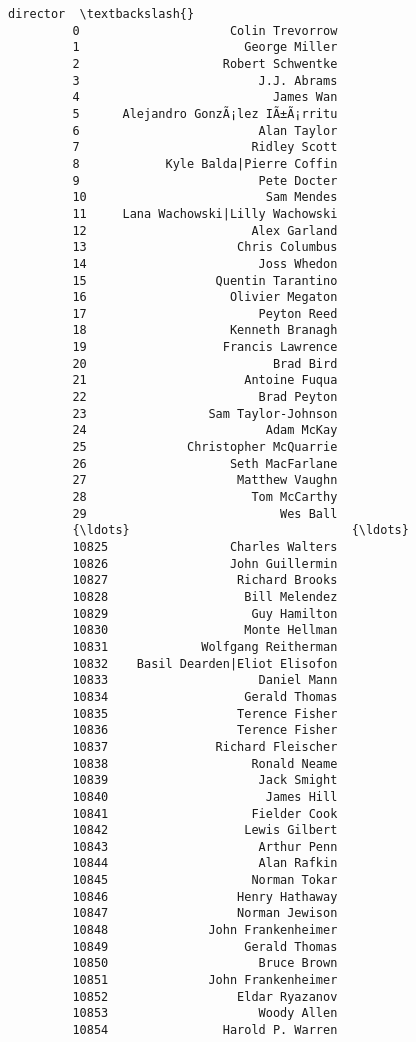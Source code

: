 \documentclass[11pt]{article}
\begin{document}
\begin{Verbatim}[commandchars=\\\{\}]
                                      director  \textbackslash{}
         0                     Colin Trevorrow   
         1                       George Miller   
         2                    Robert Schwentke   
         3                         J.J. Abrams   
         4                           James Wan   
         5      Alejandro GonzÃ¡lez IÃ±Ã¡rritu   
         6                         Alan Taylor   
         7                        Ridley Scott   
         8            Kyle Balda|Pierre Coffin   
         9                         Pete Docter   
         10                         Sam Mendes   
         11     Lana Wachowski|Lilly Wachowski   
         12                       Alex Garland   
         13                     Chris Columbus   
         14                        Joss Whedon   
         15                  Quentin Tarantino   
         16                    Olivier Megaton   
         17                        Peyton Reed   
         18                    Kenneth Branagh   
         19                   Francis Lawrence   
         20                          Brad Bird   
         21                      Antoine Fuqua   
         22                        Brad Peyton   
         23                 Sam Taylor-Johnson   
         24                         Adam McKay   
         25              Christopher McQuarrie   
         26                    Seth MacFarlane   
         27                     Matthew Vaughn   
         28                       Tom McCarthy   
         29                           Wes Ball   
         {\ldots}                               {\ldots}   
         10825                 Charles Walters   
         10826                 John Guillermin   
         10827                  Richard Brooks   
         10828                   Bill Melendez   
         10829                    Guy Hamilton   
         10830                   Monte Hellman   
         10831             Wolfgang Reitherman   
         10832    Basil Dearden|Eliot Elisofon   
         10833                     Daniel Mann   
         10834                   Gerald Thomas   
         10835                  Terence Fisher   
         10836                  Terence Fisher   
         10837               Richard Fleischer   
         10838                    Ronald Neame   
         10839                     Jack Smight   
         10840                      James Hill   
         10841                    Fielder Cook   
         10842                   Lewis Gilbert   
         10843                     Arthur Penn   
         10844                     Alan Rafkin   
         10845                    Norman Tokar   
         10846                  Henry Hathaway   
         10847                  Norman Jewison   
         10848              John Frankenheimer   
         10849                   Gerald Thomas   
         10850                     Bruce Brown   
         10851              John Frankenheimer   
         10852                  Eldar Ryazanov   
         10853                     Woody Allen   
         10854                Harold P. Warren   
         

\end{Verbatim}
\end{document}
